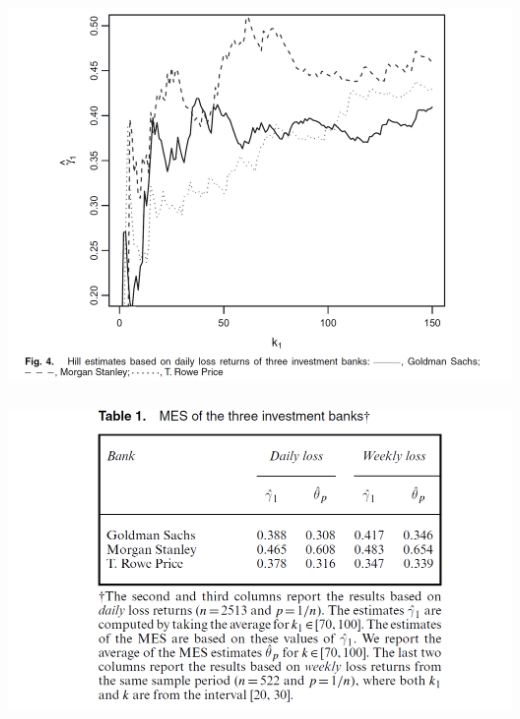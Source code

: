 \documentclass{beamer}
\begin{document}
\begin{frame}
    \frametitle{}
\includegraphics[width=1\textwidth]{Hill.png}
    

\end{frame}

\begin{frame}
    \frametitle{}
\includegraphics[width=1\textwidth]{Application.png}
    

\end{frame}
\end{document}
